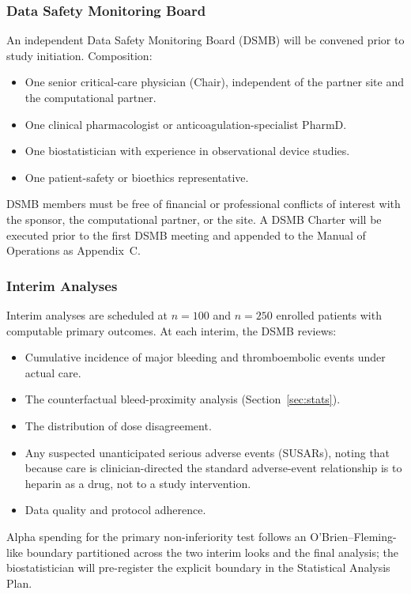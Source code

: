 \documentclass[11pt]{article}
\begin{document}
\subsubsection{Data Safety Monitoring Board}

An independent Data Safety Monitoring Board (DSMB) will be convened prior to study initiation. Composition:
\begin{itemize}
  \item One senior critical-care physician (Chair), independent of the partner site and the computational partner.
  \item One clinical pharmacologist or anticoagulation-specialist PharmD.
  \item One biostatistician with experience in observational device studies.
  \item One patient-safety or bioethics representative.
\end{itemize}

DSMB members must be free of financial or professional conflicts of interest with the sponsor, the computational partner, or the site. A DSMB Charter will be executed prior to the first DSMB meeting and appended to the Manual of Operations as Appendix~C.

\subsubsection{Interim Analyses}

Interim analyses are scheduled at $n=100$ and $n=250$ enrolled patients with computable primary outcomes. At each interim, the DSMB reviews:
\begin{itemize}
  \item Cumulative incidence of major bleeding and thromboembolic events under actual care.
  \item The counterfactual bleed-proximity analysis (Section~\ref{sec:stats}).
  \item The distribution of dose disagreement.
  \item Any suspected unanticipated serious adverse events (SUSARs), noting that because care is clinician-directed the standard adverse-event relationship is to heparin as a drug, not to a study intervention.
  \item Data quality and protocol adherence.
\end{itemize}

Alpha spending for the primary non-inferiority test follows an O'Brien--Fleming-like boundary partitioned across the two interim looks and the final analysis; the biostatistician will pre-register the explicit boundary in the Statistical Analysis Plan.
\end{document}
